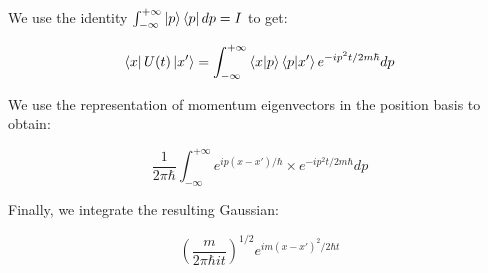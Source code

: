 
We use the identity $\int_{-\infty}^{+\infty} \ket{p}\bra{p} dp = I$ to get:

\begin{equation}
   \bra{x} U(t) \ket{x'} = \int_{-\infty}^{+\infty} \braket{x}{p}\braket{p}{x'} e^{-ip^2t/2m\hbar} dp
\end{equation}

We use the representation of momentum eigenvectors in the position basis to obtain:

\begin{equation}
   \frac{1}{2 \pi \hbar} \int_{-\infty}^{+\infty} e^{ip(x-x')/\hbar} \times e^{-ip^2t/2m\hbar} dp
\end{equation}

Finally, we integrate the resulting Gaussian:

\begin{equation}
   (\frac{m}{2 \pi \hbar i t})^{1/2} e^{im(x-x')^2/2 \hbar t}
\end{equation}
